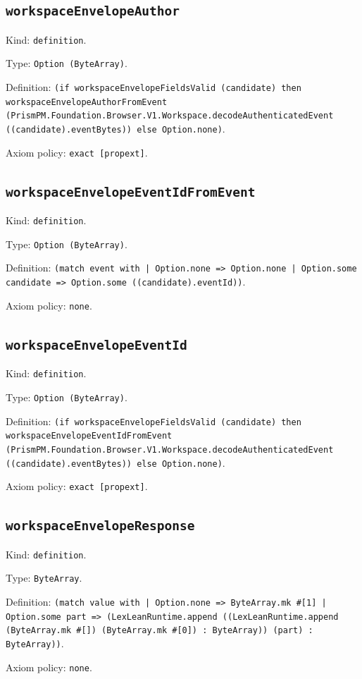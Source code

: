 \documentclass[11pt]{article}
\begin{document}
\subsection*{\texttt{workspaceEnvelopeAuthor}}
\noindent Kind: \texttt{definition}.\par
\noindent Type: \texttt{Option (ByteArray)}.\par
\noindent Definition: \texttt{(if workspaceEnvelopeFieldsValid (candidate) then workspaceEnvelopeAuthorFromEvent (PrismPM.Foundation.Browser.V1.Workspace.decodeAuthenticatedEvent ((candidate).eventBytes)) else Option.none)}.\par
\noindent Axiom policy: \texttt{exact [propext]}.\par
\subsection*{\texttt{workspaceEnvelopeEventIdFromEvent}}
\noindent Kind: \texttt{definition}.\par
\noindent Type: \texttt{Option (ByteArray)}.\par
\noindent Definition: \texttt{(match event with | Option.none => Option.none | Option.some candidate => Option.some ((candidate).eventId))}.\par
\noindent Axiom policy: \texttt{none}.\par
\subsection*{\texttt{workspaceEnvelopeEventId}}
\noindent Kind: \texttt{definition}.\par
\noindent Type: \texttt{Option (ByteArray)}.\par
\noindent Definition: \texttt{(if workspaceEnvelopeFieldsValid (candidate) then workspaceEnvelopeEventIdFromEvent (PrismPM.Foundation.Browser.V1.Workspace.decodeAuthenticatedEvent ((candidate).eventBytes)) else Option.none)}.\par
\noindent Axiom policy: \texttt{exact [propext]}.\par
\subsection*{\texttt{workspaceEnvelopeResponse}}
\noindent Kind: \texttt{definition}.\par
\noindent Type: \texttt{ByteArray}.\par
\noindent Definition: \texttt{(match value with | Option.none => ByteArray.mk \#[1] | Option.some part => (LexLeanRuntime.append ((LexLeanRuntime.append (ByteArray.mk \#[]) (ByteArray.mk \#[0]) : ByteArray)) (part) : ByteArray))}.\par
\noindent Axiom policy: \texttt{none}.\par
\end{document}
